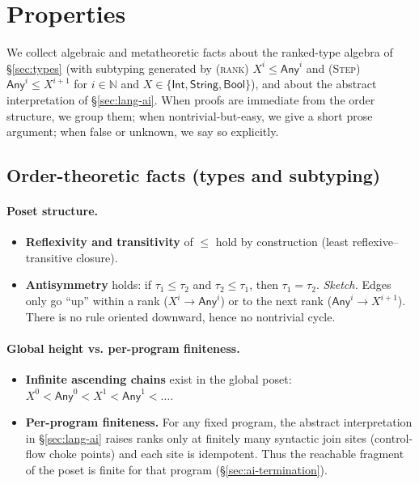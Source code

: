 \section{Properties}
\label{sec:properties}

We collect algebraic and metatheoretic facts about the ranked-type algebra of \S\ref{sec:types}
(with subtyping generated by \textsc{(rank)} $X^{i}\le \mathsf{Any}^{i}$ and \textsc{(Step)} $\mathsf{Any}^{i}\le X^{i+1}$ for $i\in\mathbb{N}$ and $X\in\{\mathsf{Int},\mathsf{String},\mathsf{Bool}\}$),
and about the abstract interpretation of \S\ref{sec:lang-ai}.
When proofs are immediate from the order structure, we group them;
when nontrivial-but-easy, we give a short prose argument;
when false or unknown, we say so explicitly.

\subsection{Order-theoretic facts (types and subtyping)}
\paragraph{Poset structure.}
\begin{itemize}
\item \textbf{Reflexivity and transitivity} of $\le$ hold by construction (least reflexive--transitive closure).
\item \textbf{Antisymmetry} holds: if $\tau_1\le \tau_2$ and $\tau_2\le \tau_1$, then $\tau_1=\tau_2$.
\emph{Sketch.} Edges only go ``up'' within a rank ($X^{i}\to \mathsf{Any}^{i}$) or to the next rank ($\mathsf{Any}^{i}\to X^{i+1}$).
There is no rule oriented downward, hence no nontrivial cycle.
\end{itemize}

\paragraph{Global height vs. per-program finiteness.}
\begin{itemize}
\item \textbf{Infinite ascending chains} exist in the global poset:
$X^{0} < \mathsf{Any}^{0} < X^{1} < \mathsf{Any}^{1} < \dots$.
\item \textbf{Per-program finiteness.} For any fixed program, the abstract interpretation in \S\ref{sec:lang-ai}
raises ranks only at finitely many syntactic join sites (control-flow choke points) and each site is idempotent.
Thus the reachable fragment of the poset is finite for that program (\S\ref{sec:ai-termination}).
\end{itemize}

